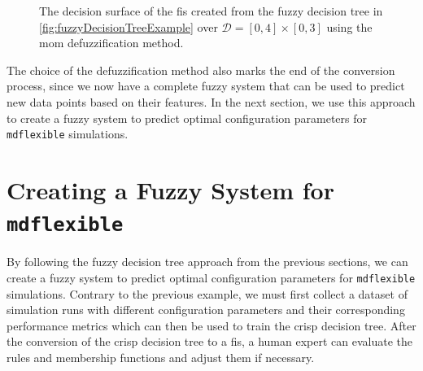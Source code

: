 \begin{multicols}{2}
    \columnbreak

    \begin{figure}[H]
        \caption[Decision surface of the fuzzy rules using MOM method]{The decision surface of the  \gls{fis} created from the fuzzy decision tree in \autoref{fig:fuzzyDecisionTreeExample} over $\mathcal{D}=[0,4]\times[0,3]$ using the \gls{mom} defuzzification method.}
        \label{fig:fuzzyDecisionSurfaceExampleMOM}
    \end{figure}
\end{multicols}

\noindent The choice of the defuzzification method also marks the end of the conversion process, since we now have a complete fuzzy system that can be used to predict new data points based on their features. In the next section, we use this approach to create a fuzzy system to predict optimal configuration parameters for \texttt{\gls{mdflexible}} simulations.

\section{Creating a Fuzzy System for \texttt{\gls{mdflexible}}}

By following the fuzzy decision tree approach from the previous sections, we can create a fuzzy system to predict optimal configuration parameters for \texttt{\gls{mdflexible}} simulations. Contrary to the previous example, we must first collect a dataset of simulation runs with different configuration parameters and their corresponding performance metrics which can then be used to train the crisp decision tree. After the conversion of the crisp decision tree to a \gls{fis}, a human expert can evaluate the rules and membership functions and adjust them if necessary.

